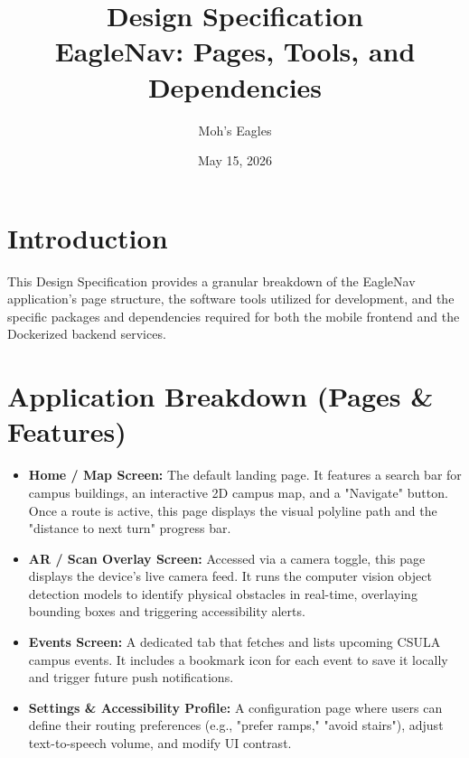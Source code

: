 \documentclass[12pt]{article}
\title{\textbf{Design Specification}\\ \large EagleNav: Pages, Tools, and Dependencies}
\author{Moh's Eagles}
\date{May 15, 2026}
\begin{document}
\maketitle

\section{Introduction}
This Design Specification provides a granular breakdown of the EagleNav application's page structure, the software tools utilized for development, and the specific packages and dependencies required for both the mobile frontend and the Dockerized backend services.

\section{Application Breakdown (Pages \& Features)}
\begin{itemize}
    \item \textbf{Home / Map Screen:} The default landing page. It features a search bar for campus buildings, an interactive 2D campus map, and a "Navigate" button. Once a route is active, this page displays the visual polyline path and the "distance to next turn" progress bar.
    \item \textbf{AR / Scan Overlay Screen:} Accessed via a camera toggle, this page displays the device's live camera feed. It runs the computer vision object detection models to identify physical obstacles in real-time, overlaying bounding boxes and triggering accessibility alerts.
    \item \textbf{Events Screen:} A dedicated tab that fetches and lists upcoming CSULA campus events. It includes a bookmark icon for each event to save it locally and trigger future push notifications.
    \item \textbf{Settings \& Accessibility Profile:} A configuration page where users can define their routing preferences (e.g., "prefer ramps," "avoid stairs"), adjust text-to-speech volume, and modify UI contrast.
\end{itemize}
\end{document}
